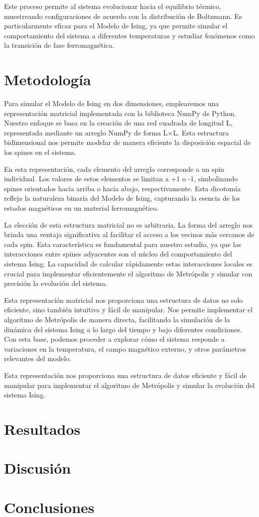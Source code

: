 \documentclass[twocolumn]{article}
\begin{document}
Este proceso permite al sistema evolucionar hacia el equilibrio térmico, muestreando configuraciones de acuerdo con la distribución de Boltzmann. Es particularmente eficaz para el Modelo de Ising, ya que permite simular el comportamiento del sistema a diferentes temperaturas y estudiar fenómenos como la transición de fase ferromagnética.


\section{Metodología}

Para simular el Modelo de Ising en dos dimensiones, emplearemos una representación matricial implementada con la biblioteca NumPy de Python. Nuestro enfoque se basa en la creación de una red cuadrada de longitud L, representada mediante un arreglo NumPy de forma L×L. Esta estructura bidimensional nos permite modelar de manera eficiente la disposición espacial de los spines en el sistema.

En esta representación, cada elemento del arreglo corresponde a un spin individual. Los valores de estos elementos se limitan a +1 o -1, simbolizando spines orientados hacia arriba o hacia abajo, respectivamente. Esta dicotomía refleja la naturaleza binaria del Modelo de Ising, capturando la esencia de los estados magnéticos en un material ferromagnético.

La elección de esta estructura matricial no es arbitraria. La forma del arreglo nos brinda una ventaja significativa al facilitar el acceso a los vecinos más cercanos de cada spin. Esta característica es fundamental para nuestro estudio, ya que las interacciones entre spines adyacentes son el núcleo del comportamiento del sistema Ising. La capacidad de calcular rápidamente estas interacciones locales es crucial para implementar eficientemente el algoritmo de Metrópolis y simular con precisión la evolución del sistema.

Esta representación matricial nos proporciona una estructura de datos no solo eficiente, sino también intuitiva y fácil de manipular. Nos permite implementar el algoritmo de Metrópolis de manera directa, facilitando la simulación de la dinámica del sistema Ising a lo largo del tiempo y bajo diferentes condiciones. Con esta base, podemos proceder a explorar cómo el sistema responde a variaciones en la temperatura, el campo magnético externo, y otros parámetros relevantes del modelo.

Esta representación nos proporciona una estructura de datos eficiente y fácil de manipular para implementar el algoritmo de Metrópolis y simular la evolución del sistema Ising.



\section{Resultados}

\section{Discusión}

\section{Conclusiones}



\end{document}
